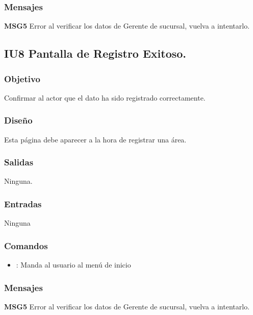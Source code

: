 \subsubsection{Mensajes}
	\begin{Citemize}
		\item {\bf MSG5} Error al verificar los datos de Gerente de sucursal, vuelva a intentarlo.
	\end{Citemize}


\subsection{IU8 Pantalla de Registro Exitoso.}

\subsubsection{Objetivo}
	Confirmar al actor que el dato ha sido registrado correctamente.

\subsubsection{Diseño}
	Esta página debe aparecer a la hora de registrar una área. 


\subsubsection{Salidas}

	Ninguna.

\subsubsection{Entradas}
Ninguna

\subsubsection{Comandos}
\begin{itemize}
	\item {}: Manda al usuario al menú de inicio
\end{itemize}

\subsubsection{Mensajes}
	\begin{Citemize}
		\item {\bf MSG5} Error al verificar los datos de Gerente de sucursal, vuelva a intentarlo.
	\end{Citemize}

